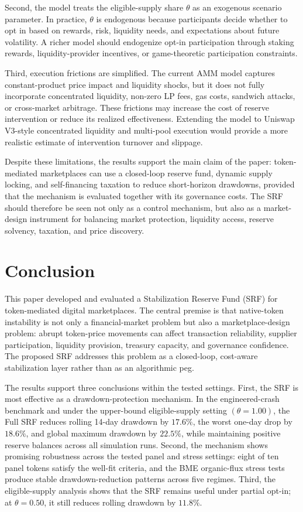 \documentclass[a4paper,fleqn]{cas-dc}
\begin{document}
Second, the model treats the eligible-supply share \(\theta\) as an exogenous scenario parameter. In practice, \(\theta\) is endogenous because participants decide whether to opt in based on rewards, risk, liquidity needs, and expectations about future volatility. A richer model should endogenize opt-in participation through staking rewards, liquidity-provider incentives, or game-theoretic participation constraints.

Third, execution frictions are simplified. The current AMM model captures constant-product price impact and liquidity shocks, but it does not fully incorporate concentrated liquidity, non-zero LP fees, gas costs, sandwich attacks, or cross-market arbitrage. These frictions may increase the cost of reserve intervention or reduce its realized effectiveness. Extending the model to Uniswap V3-style concentrated liquidity and multi-pool execution would provide a more realistic estimate of intervention turnover and slippage.

Despite these limitations, the results support the main claim of the paper: token-mediated marketplaces can use a closed-loop reserve fund, dynamic supply locking, and self-financing taxation to reduce short-horizon drawdowns, provided that the mechanism is evaluated together with its governance costs. The SRF should therefore be seen not only as a control mechanism, but also as a market-design instrument for balancing market protection, liquidity access, reserve solvency, taxation, and price discovery.

\section{Conclusion}
\label{sec:conclusion}

This paper developed and evaluated a Stabilization Reserve Fund (SRF) for token-mediated digital marketplaces. The central premise is that native-token instability is not only a financial-market problem but also a marketplace-design problem: abrupt token-price movements can affect transaction reliability, supplier participation, liquidity provision, treasury capacity, and governance confidence. The proposed SRF addresses this problem as a closed-loop, cost-aware stabilization layer rather than as an algorithmic peg.

The results support three conclusions within the tested settings. First, the SRF is most effective as a drawdown-protection mechanism. In the engineered-crash benchmark and under the upper-bound eligible-supply setting \((\theta=1.00)\), the Full SRF reduces rolling 14-day drawdown by \(17.6\%\), the worst one-day drop by \(18.6\%\), and global maximum drawdown by \(22.5\%\), while maintaining positive reserve balances across all simulation runs. Second, the mechanism shows promising robustness across the tested panel and stress settings: eight of ten panel tokens satisfy the well-fit criteria, and the BME organic-flux stress tests produce stable drawdown-reduction patterns across five regimes. Third, the eligible-supply analysis shows that the SRF remains useful under partial opt-in; at \(\theta=0.50\), it still reduces rolling drawdown by \(11.8\%\).
\end{document}
